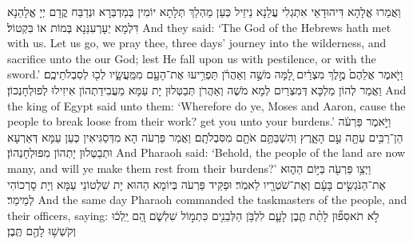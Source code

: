 {וַאֲמַרוּ אֱלָהָא דִּיהוּדָאֵי אִתְגְלִי עֲלַנָא נֵיזֵיל כְּעַן מַהְלַךְ תְּלָתָא יוֹמִין בְּמַדְבְּרָא וּנְדַבַּח קֳדָם יְיָ אֱלָהַנָא דִּלְמָא יְעָרְעִנַּנָא בְּמוֹת אוֹ בִּקְטוֹל׃}
{And they said: ‘The God of the Hebrews hath met with us. Let us go, we pray thee, three days’ journey into the wilderness, and sacrifice unto the \lord\space our God; lest He fall upon us with pestilence, or with the sword.’}{}
{וַיֹּ֤אמֶר אֲלֵהֶם֙ מֶ֣לֶךְ מִצְרַ֔יִם לָ֚מָּה מֹשֶׁ֣ה וְאַהֲרֹ֔ן תַּפְרִ֥יעוּ אֶת־הָעָ֖ם מִמַּֽעֲשָׂ֑יו לְכ֖וּ לְסִבְלֹתֵיכֶֽם׃
}
{וַאֲמַר לְהוֹן מַלְכָּא דְּמִצְרַיִם לְמָא מֹשֶׁה וְאַהֲרֹן תְּבַטְּלוּן יָת עַמָּא מֵעֲבִידַתְהוֹן אִיזִילוּ לְפוּלְחָנְכוֹן׃}
{And the king of Egypt said unto them: ‘Wherefore do ye, Moses and Aaron, cause the people to break loose from their work? get you unto your burdens.’}{}
{וַיֹּ֣אמֶר פַּרְעֹ֔ה הֵן־רַבִּ֥ים עַתָּ֖ה עַ֣ם הָאָ֑רֶץ וְהִשְׁבַּתֶּ֥ם אֹתָ֖ם מִסִּבְלֹתָֽם׃
}
{וַאֲמַר פַּרְעֹה הָא מִדְּסַגִּיאִין כְּעַן עַמָּא דְּאַרְעָא וּתְבַטְּלוּן יָתְהוֹן מִפּוּלְחָנְהוֹן׃}
{And Pharaoh said: ‘Behold, the people of the land are now many, and will ye make them rest from their burdens?’}{}
{וַיְצַ֥ו פַּרְעֹ֖ה בַּיּ֣וֹם הַה֑וּא אֶת־הַנֹּגְשִׂ֣ים בָּעָ֔ם וְאֶת־שֹׁטְרָ֖יו לֵאמֹֽר׃
}
{וּפַקֵּיד פַּרְעֹה בְּיוֹמָא הַהוּא יָת שִׁלְטוֹנֵי עַמָּא וְיָת סָרְכוֹהִי לְמֵימַר׃}
{And the same day Pharaoh commanded the taskmasters of the people, and their officers, saying:}{}
{לֹ֣א תֹאסִפ֞וּן לָתֵ֨ת תֶּ֧בֶן לָעָ֛ם לִלְבֹּ֥ן הַלְּבֵנִ֖ים כִּתְמ֣וֹל שִׁלְשֹׁ֑ם הֵ֚ם יֵֽלְכ֔וּ וְקֹשְׁשׁ֥וּ לָהֶ֖ם תֶּֽבֶן׃
}
